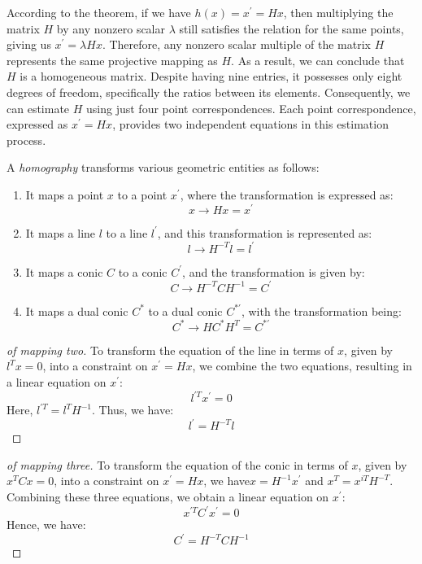 \documentclass[12pt, a4paper]{report}
\begin{document}
    According to the theorem, if we have $h(x)=x^{'}=Hx$, then multiplying the matrix $H$ by any nonzero scalar $\lambda$ still satisfies the relation for the same points, giving us $x^{'}=\lambda Hx$. 
    Therefore, any nonzero scalar multiple of the matrix $H$ represents the same projective mapping as $H$.
    As a result, we can conclude that $H$ is a homogeneous matrix.
    Despite having nine entries, it possesses only eight degrees of freedom, specifically the ratios between its elements. 
    Consequently, we can estimate $H$ using just four point correspondences.
    Each point correspondence, expressed as $x^{'}=Hx$, provides two independent equations in this estimation process.
    \newpage
    \begin{definition}
        A \emph{homography} transforms various geometric entities as follows:
        \begin{enumerate}
            \item It maps a point $x$ to a point $x^{'}$, where the transformation is expressed as: 
                \[x \rightarrow H x=x^{'}\]
            \item It maps a line $l$ to a line $l^{'}$, and this transformation is represented as: 
                \[l \rightarrow H^{-T} l=l^{'}\]
            \item It maps a conic $C$ to a conic $C^{'}$, and the transformation is given by: 
                \[C \rightarrow H^{-T} CH^{-1}=C^{'}\]
            \item It maps a dual conic $C^{*}$ to a dual conic $C^{*'}$, with the transformation being: 
                \[C^{*} \rightarrow H C^{*}H^{T}=C^{*'}\]
        \end{enumerate}
    \end{definition}
    \begin{proof}[of mapping two]
        To transform the equation of the line in terms of $x$, given by $l^Tx=0$, into a constraint on $x^{'}=Hx$, we combine the two equations, resulting in a linear equation on $x^{'}$: 
        \[l^{'T}x^{'}=0\]
        Here, $l^{'T}=l^{T}H^{-1}$. 
        Thus, we have:
        \[l^{'}=H^{-T}l\]
    \end{proof}
    \begin{proof}[of mapping three]
        To transform the equation of the conic in terms of $x$, given by $x^{T}Cx=0$, into a constraint on $x^{'}=Hx$, we have$x=H^{-1}x^{'}$ and $x^{T}=x^{iT}H^{-T}$. 
        Combining these three equations, we obtain a linear equation on $x^{'}$: 
        \[x^{'T}C^{'}x^{'}=0\]
        Hence, we have:
        \[C^{'}=H^{-T} CH^{-1}\]
    \end{proof}
\end{document}
